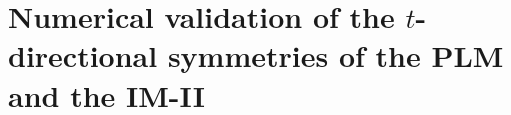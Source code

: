 \documentclass[12pt]{article}
\begin{document}


\section{Numerical validation of the $t$-directional  symmetries of the PLM and the IM-II}




%

\newpage
 


\end{document}
